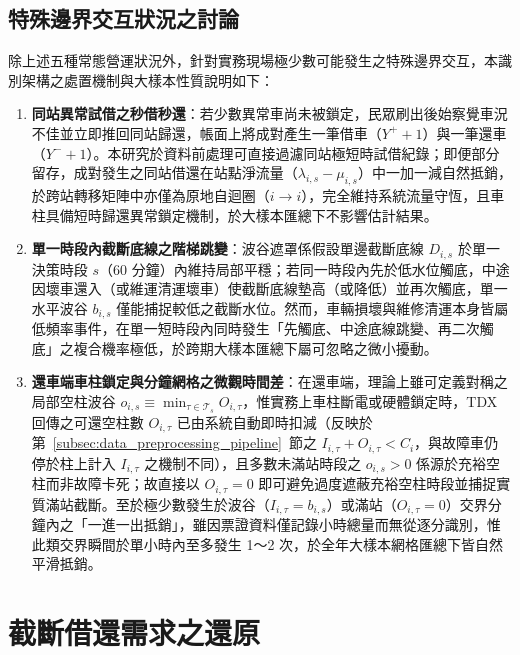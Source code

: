 \subsection{特殊邊界交互狀況之討論}\label{subsec:edge_case_interactions}

除上述五種常態營運狀況外，針對實務現場極少數可能發生之特殊邊界交互，本識別架構之處置機制與大樣本性質說明如下：

\begin{enumerate}
    \item \textbf{同站異常試借之秒借秒還}：若少數異常車尚未被鎖定，民眾刷出後始察覺車況不佳並立即推回同站歸還，帳面上將成對產生一筆借車（$Y^+ + 1$）與一筆還車（$Y^- + 1$）。本研究於資料前處理可直接過濾同站極短時試借紀錄；即便部分留存，成對發生之同站借還在站點淨流量（$\lambda_{i,s} - \mu_{i,s}$）中一加一減自然抵銷，於跨站轉移矩陣中亦僅為原地自迴圈（$i \to i$），完全維持系統流量守恆，且車柱具備短時歸還異常鎖定機制，於大樣本匯總下不影響估計結果。

    \item \textbf{單一時段內截斷底線之階梯跳變}：波谷遮罩係假設單邊截斷底線 $D_{i,s}$ 於單一決策時段 $s$（60 分鐘）內維持局部平穩；若同一時段內先於低水位觸底，中途因壞車還入（或維運清運壞車）使截斷底線墊高（或降低）並再次觸底，單一水平波谷 $b_{i,s}$ 僅能捕捉較低之截斷水位。然而，車輛損壞與維修清運本身皆屬低頻率事件，在單一短時段內同時發生「先觸底、中途底線跳變、再二次觸底」之複合機率極低，於跨期大樣本匯總下屬可忽略之微小擾動。

    \item \textbf{還車端車柱鎖定與分鐘網格之微觀時間差}：在還車端，理論上雖可定義對稱之局部空柱波谷 $o_{i,s} \equiv \min_{\tau \in \mathcal{T}_s} O_{i,\tau}$，惟實務上車柱斷電或硬體鎖定時，TDX 回傳之可還空柱數 $O_{i,\tau}$ 已由系統自動即時扣減（反映於第~\ref{subsec:data_preprocessing_pipeline}~節之 $I_{i,\tau} + O_{i,\tau} < C_i$，與故障車仍停於柱上計入 $I_{i,\tau}$ 之機制不同），且多數未滿站時段之 $o_{i,s} > 0$ 係源於充裕空柱而非故障卡死；故直接以 $O_{i,\tau} = 0$ 即可避免過度遮蔽充裕空柱時段並捕捉實質滿站截斷。至於極少數發生於波谷（$I_{i,\tau} = b_{i,s}$）或滿站（$O_{i,\tau} = 0$）交界分鐘內之「一進一出抵銷」，雖因票證資料僅記錄小時總量而無從逐分識別，惟此類交界瞬間於單小時內至多發生 1～2 次，於全年大樣本網格匯總下皆自然平滑抵銷。
\end{enumerate}

\section{截斷借還需求之還原}\label{sec:demand_reconstruction}

